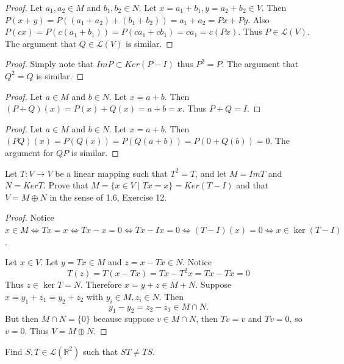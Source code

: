 \begin{proof}
    Let $a_1, a_2 \in M$ and $b_1, b_2 \in N$.
    Let $x = a_1 + b_1, y = a_2 + b_2 \in V$.
    Then $P(x + y) = P((a_1 + a_2) + (b_1 + b_2)) = a_1 + a_2  = Px + Py$.
    Also $P(cx) = P(c(a_1 + b_1)) = P(ca_1 + cb_1) = ca_1 = c(Px)$.
    Thus $P \in \mathcal{L}(V)$. The argument that $Q \in \mathcal{L}(V)$ is similar.
\end{proof}

\begin{proof}
    Simply note that $Im P \subset Ker (P - I)$ thus $P^2 = P$.
    The argument that $Q^2 = Q$ is similar.
\end{proof}

\begin{proof}
    Let $a \in M$ and $b \in N$.
    Let $x = a + b$.
    Then $(P + Q)(x) = P(x) + Q(x) = a + b = x$.
    Thus $P + Q = I$.
\end{proof}

\begin{proof}
    Let $a \in M$ and $b \in N$.
    Let $x = a + b$.
    Then $(PQ)(x) = P(Q(x)) = P(Q(a + b)) = P(0 + Q(b)) = 0$.
    The argument for $QP$ is similar.
\end{proof}

\begin{tcolorbox}[title=Problem 13, breakable]
    Let $T : V \longrightarrow V$ be a linear mapping such that $T^2 = T$,
    and let $M = Im T$ and $N = Ker T$. 
    Prove that $M = \{x \in V \mid Tx = x\} = Ker (T - I)$ and that 
    $V = M \oplus N$ in the sense of 1.6, Exercise 12.
\end{tcolorbox}

\begin{proof}
    Notice $x \in M \iff Tx = x \iff Tx - x = 0 \iff Tx - Ix = 0 \iff (T - I)(x) = 0 \iff x \in \ker(T - I)$.

    Let $x \in V$.
    Let $y = Tx \in M$ and $z = x - Tx \in N$.
    Notice
    \[
    T(z) = T(x - Tx) = Tx - T^2 x = Tx - Tx = 0
    \]
    Thus $z \in \ker T = N$.
    Therefore $x = y + z \in M + N$.
    Suppose $x = y_1 + z_1 = y_2 + z_2$ with $y_i \in M, z_i \in N$. Then
    \[
    y_1 - y_2 = z_2 - z_1 \in M \cap N.
    \]
    But then $M \cap N = \{0\}$ because suppose $v \in M \cap N$, then $Tv = v$ and $Tv = 0$, so $v = 0$.
    Thus $V = M \oplus N$.
\end{proof}

\begin{tcolorbox}[title=Problem 14, breakable]
    Find $S, T \in \mathcal{L}(\mathbb{R}^2)$
        such that $ST \ne TS$.
\end{tcolorbox}

